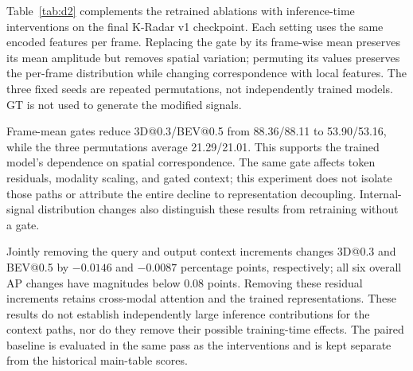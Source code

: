 Table~\ref{tab:d2} complements the retrained ablations with inference-time interventions on the final K-Radar v1 checkpoint. Each setting uses the same encoded features per frame. Replacing the gate by its frame-wise mean preserves its mean amplitude but removes spatial variation; permuting its values preserves the per-frame distribution while changing correspondence with local features. The three fixed seeds are repeated permutations, not independently trained models. GT is not used to generate the modified signals.

Frame-mean gates reduce 3D@0.3/BEV@0.5 from 88.36/88.11 to 53.90/53.16, while the three permutations average 21.29/21.01. This supports the trained model's dependence on spatial correspondence. The same gate affects token residuals, modality scaling, and gated context; this experiment does not isolate those paths or attribute the entire decline to representation decoupling. Internal-signal distribution changes also distinguish these results from retraining without a gate.

Jointly removing the query and output context increments changes 3D@0.3 and BEV@0.5 by \(-0.0146\) and \(-0.0087\) percentage points, respectively; all six overall AP changes have magnitudes below 0.08 points. Removing these residual increments retains cross-modal attention and the trained representations. These results do not establish independently large inference contributions for the context paths, nor do they remove their possible training-time effects. The paired baseline is evaluated in the same pass as the interventions and is kept separate from the historical main-table scores.


